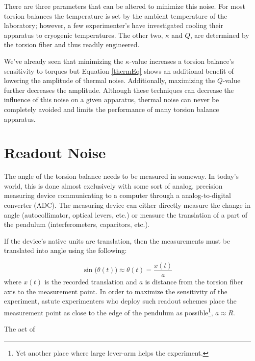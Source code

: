 \documentclass{book}
\begin{document}
There are three parameters that can be altered to minimize this noise. For most torsion balances the temperature is set by the ambient temperature of the laboratory; however, a few experimenter's have investigated cooling their apparatus to cryogenic temperatures. The other two, $\kappa$ and $Q$, are determined by the torsion fiber and thus readily engineered. 

We've already seen that minimizing the $\kappa$-value increases a torsion balance's sensitivity to torques but Equation \ref{thermEq} shows an additional benefit of lowering the amplitude of thermal noise. Additionally, maximizing the $Q$-value further decreases the amplitude. Although these techniques can decrease the influence of this noise on a given apparatus, thermal noise can never be completely avoided and limits the performance of many torsion balance apparatus.

\section{Readout Noise}\label{readout}

\quad The angle of the torsion balance needs to be measured in someway. In today's world, this is done almost exclusively with some sort of analog, precision measuring device communicating to a computer through a analog-to-digital converter (ADC). The measuring device can either directly measure the change in angle (autocollimator, optical levers, etc.) or measure the translation of a part of the pendulum (interferometers, capacitors, etc.). 

If the device's native units are translation, then the measurements must be translated into angle using the following:

\begin{equation}
\sin\big(\theta(t)\big)\approx \theta(t)=\frac{x(t)}{a}
\end{equation}
where $x(t)$ is the recorded translation and $a$ is distance from the torsion fiber axis to the measurement point. In order to maximize the sensitivity of the experiment, astute experimenters who deploy such readout schemes place the measurement point as close to the edge of the pendulum as possible\footnote{Yet another place where large lever-arm helps the experiment.}, $a\approx R$. 

The act of 
\end{document}
